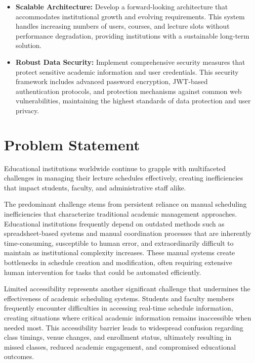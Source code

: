 \begin{itemize}[leftmargin=*]
    \item \textbf{Scalable Architecture:} Develop a forward-looking architecture that accommodates institutional growth and evolving requirements. This system handles increasing numbers of users, courses, and lecture slots without performance degradation, providing institutions with a sustainable long-term solution.
    
    \item \textbf{Robust Data Security:} Implement comprehensive security measures that protect sensitive academic information and user credentials. This security framework includes advanced password encryption, JWT-based authentication protocols, and protection mechanisms against common web vulnerabilities, maintaining the highest standards of data protection and user privacy.
\end{itemize}

\section{Problem Statement}
Educational institutions worldwide continue to grapple with multifaceted challenges in managing their lecture schedules effectively, creating inefficiencies that impact students, faculty, and administrative staff alike.

The predominant challenge stems from persistent reliance on manual scheduling inefficiencies that characterize traditional academic management approaches. Educational institutions frequently depend on outdated methods such as spreadsheet-based systems and manual coordination processes that are inherently time-consuming, susceptible to human error, and extraordinarily difficult to maintain as institutional complexity increases. These manual systems create bottlenecks in schedule creation and modification, often requiring extensive human intervention for tasks that could be automated efficiently.

Limited accessibility represents another significant challenge that undermines the effectiveness of academic scheduling systems. Students and faculty members frequently encounter difficulties in accessing real-time schedule information, creating situations where critical academic information remains inaccessible when needed most. This accessibility barrier leads to widespread confusion regarding class timings, venue changes, and enrollment status, ultimately resulting in missed classes, reduced academic engagement, and compromised educational outcomes.

